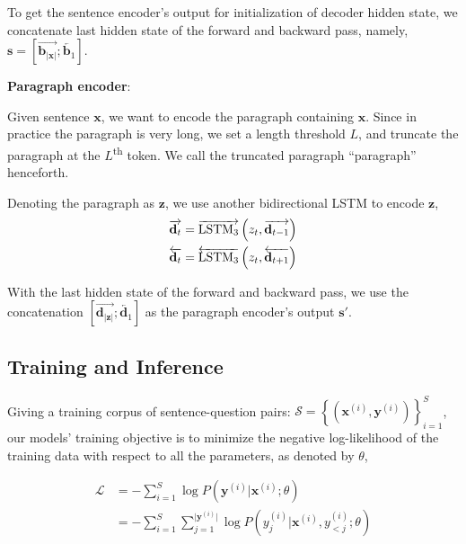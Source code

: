 \documentclass[11pt,a4paper]{article}
\begin{document}
To get the sentence encoder's output for initialization of decoder hidden state, we concatenate last hidden state of the forward and backward pass, namely, $\mathbf{s} = [\overrightarrow{\mathbf{b}_{|\mathbf{x}|}}; \overleftarrow{\mathbf{b}_1} ]$. 


\vspace{0.3cm}
\noindent \textbf{Paragraph encoder}:
\vspace{0.01cm}

Given sentence $\mathbf{x}$, we want to encode the paragraph containing $\mathbf{x}$. Since in practice the paragraph is very long, we set a length threshold $L$, and truncate the paragraph at the $L$\textsuperscript{th} token. We call the truncated paragraph ``paragraph'' henceforth. 

Denoting the paragraph as $\mathbf{z}$, we use another bidirectional LSTM to encode $\mathbf{z}$,
\begin{equation}
\nonumber
\begin{split}
\overrightarrow{\mathbf{d}_t} &= \overrightarrow{{\textnormal{LSTM}_3}} \left( z_{t}, \overrightarrow{\mathbf{d}_{t-1}}\right) \\
\overleftarrow{\mathbf{d}_t} &= \overleftarrow{{\textnormal{LSTM}_3}} \left( z_{t}, \overleftarrow{\mathbf{d}_{t+1}}\right) \\
\end{split}
\end{equation}

With the last hidden state of the forward and backward pass, we use the concatenation $[\overrightarrow{\mathbf{d}_{|\mathbf{z}|}}; \overleftarrow{\mathbf{d}_1} ]$ as the paragraph encoder's output $\mathbf{s}'$.


\subsection{Training and Inference}

Giving a training corpus of sentence-question pairs: $\mathcal{S} = \left\{ \left( \mathbf{x}^{(i)}, \mathbf{y}^{(i)}\right) \right\}_{i=1}^{S}$, our models' training objective is to minimize the negative log-likelihood of the training data with respect to all the parameters, as denoted by $\theta$,

\begin{equation} \label{equ:loss}
\nonumber
\begin{split}
\mathcal{L} & = - \sum_{i=1}^{S} \log P \left( \mathbf{y}^{(i)}\vert \mathbf{x}^{(i)}; \theta \right) \\
 & = - \sum_{i=1}^{S} \sum_{j=1}^{\vert \mathbf{y}^{(i)} \vert} \log P \left( y_{j}^{(i)}\vert \mathbf{x}^{(i)}, y_{ <j}^{(i)} ; \theta \right)
\end{split}
\end{equation}
\end{document}
